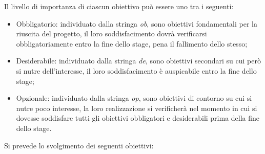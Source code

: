 Il livello di importanza di ciascun obiettivo può essere uno tra i seguenti:
\begin{itemize}
	\item Obbligatorio: individuato dalla stringa \textit{ob}, sono obiettivi fondamentali per la riuscita del progetto, il loro soddisfacimento dovrà verificarsi obbligatoriamente entro la fine dello stage, pena il fallimento dello stesso;
	\item Desiderabile: individuato dalla stringa \textit{de}, sono obiettivi secondari su cui però si nutre dell'interesse, il loro soddisfacimento è auspicabile entro la fine dello stage;
	\item Opzionale: individuato dalla stringa \textit{op}, sono obiettivi di contorno su cui si nutre poco interesse, la loro realizzazione si verificherà nel momento in cui si dovesse soddisfare tutti gli obiettivi obbligatori e desiderabili prima della fine dello stage.
\end{itemize}
Si prevede lo svolgimento dei seguenti obiettivi:
